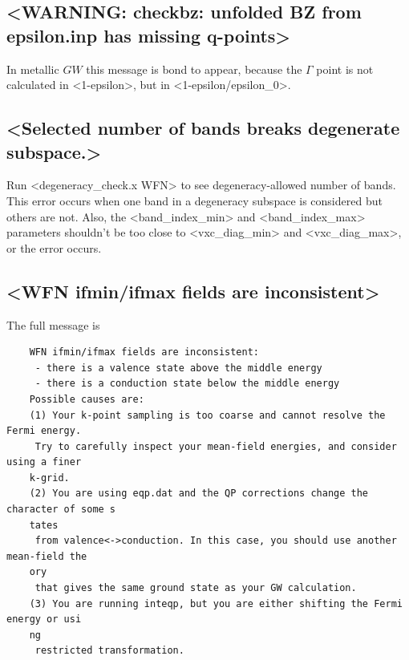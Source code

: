 \documentclass[hyperref, a4paper, 12pt]{report}
\def\texttt#1{<#1>}%
\newcommand{\shortcode}[1]{\texttt{#1}}
\begin{document}
\subsection{\shortcode{WARNING: checkbz: unfolded BZ from epsilon.inp has missing q-points}}

In metallic $GW$ this message is bond to appear,
because the $\Gamma$ point is not calculated in \shortcode{1-epsilon},
but in \shortcode{1-epsilon/epsilon_0}.

\subsection{\shortcode{Selected number of bands breaks degenerate subspace.}}\label{sec:degenerate-breaking}

Run \shortcode{degeneracy_check.x WFN} to see degeneracy-allowed number of bands.
This error occurs when one band in a degeneracy subspace is considered 
but others are not.
Also, the \shortcode{band_index_min} and \shortcode{band_index_max} parameters
shouldn't be too close to \shortcode{vxc_diag_min} and \shortcode{vxc_diag_max}, 
or the error occurs.

\subsection{\shortcode{WFN ifmin/ifmax fields are inconsistent}}\label{sec:semimetal-error-1}

The full message is 
\begin{lstlisting}
    WFN ifmin/ifmax fields are inconsistent:
     - there is a valence state above the middle energy
     - there is a conduction state below the middle energy
    Possible causes are:
    (1) Your k-point sampling is too coarse and cannot resolve the Fermi energy.
     Try to carefully inspect your mean-field energies, and consider using a finer 
    k-grid.
    (2) You are using eqp.dat and the QP corrections change the character of some s
    tates
     from valence<->conduction. In this case, you should use another mean-field the
    ory
     that gives the same ground state as your GW calculation.
    (3) You are running inteqp, but you are either shifting the Fermi energy or usi
    ng 
     restricted transformation.   
\end{lstlisting}
\end{document}
